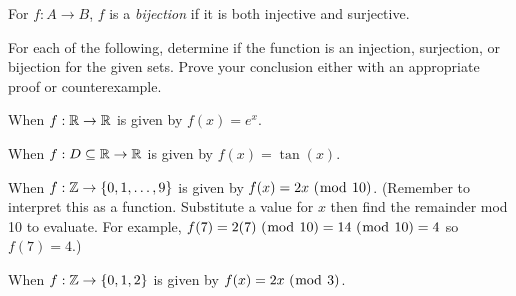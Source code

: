 \begin{definition}  For $f: A \to B$, $f$ is a \textit{bijection} if it is both injective and surjective.
\end{definition}
\begin{question}
\item For each of the following, determine if the function is an injection, surjection, or bijection for the given sets.  Prove your conclusion either with an appropriate proof or counterexample.
	\begin{qpart}
	\item When $f: \mathbb{R} \to \mathbb{R}$ is given by $f(x)=e^x$.
	
	\vspace{2in}
	
	\item When $f: D \subseteq \mathbb{R} \to \mathbb{R}$ is given by $f(x)=\tan(x)$.
	
	\newpage
	
	\item When $f: \mathbb{Z} \to \left\{0,1,\ldots,9\right\}$ is given by $f(x) = 2x \ (\bmod \ 10)$.  (Remember to interpret this as a function.  Substitute a value for $x$ then find the remainder mod 10 to evaluate.  For example, $f(7) = 2(7) \ (\bmod \ 10) = 14 \ (\bmod \ 10) = 4$ so $f(7)=4$.)
	
	\vspace{3.5in}
	
	\item When $f: \mathbb{Z} \to \left\{0,1,2\right\}$ is given by $f(x) = 2x \ (\bmod \ 3)$.
	\end{qpart}
\end{question}





